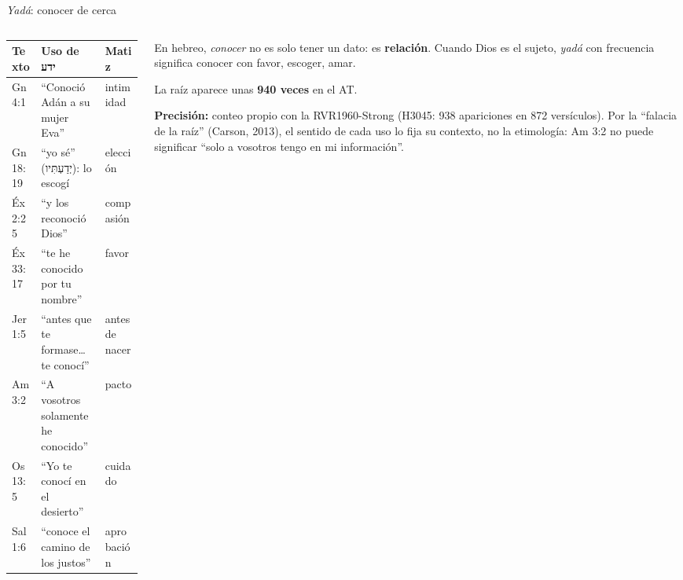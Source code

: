 \documentclass[hyperref={bookmarks=false},aspectratio=169]{beamer}
\newcommand{\heb}[1]{\mbox{\foreignlanguage{hebrew}{#1}}}
\newcommand{\destacar}[1]{\textbf{\textcolor{azul}{#1}}}
\newcommand{\precision}[1]{{\footnotesize\color{gris}\textbf{Precisión:} #1}}
\begin{document}
\begin{frame}{\emph{Yadá}: conocer de cerca}
\begin{columns}[t,onlytextwidth]
\begin{column}{0.55\textwidth}
\scriptsize\renewcommand{\arraystretch}{1.14}
\begin{tabular}{@{}>{\RaggedRight\arraybackslash}p{2.0cm}>{\RaggedRight\arraybackslash}p{2.9cm}>{\RaggedRight\arraybackslash}p{1.3cm}@{}}
\toprule
\textbf{Texto} & \textbf{Uso de \heb{ידע}} & \textbf{Matiz} \\ \midrule
Gn 4:1 & ``Conoció Adán a su mujer Eva'' & intimidad \\
Gn 18:19 & ``yo sé'' (\heb{יְדַעְתִּיו}): lo escogí & elección \\
Éx 2:25 & ``y los reconoció Dios'' & compasión \\
Éx 33:17 & ``te he conocido por tu nombre'' & favor \\
Jer 1:5 & ``antes que te formase\ldots{} te conocí'' & antes de nacer \\
Am 3:2 & ``A vosotros solamente he conocido'' & pacto \\
Os 13:5 & ``Yo te conocí en el desierto'' & cuidado \\
Sal 1:6 & ``conoce el camino de los justos'' & aprobación \\
\bottomrule
\end{tabular}
\end{column}
\begin{column}{0.43\textwidth}\small
En hebreo, \emph{conocer} no es solo tener un dato: es \destacar{relación}. Cuando Dios es el sujeto, \emph{yadá} con frecuencia significa conocer con favor, escoger, amar.\par\smallskip
\scriptsize La raíz aparece unas \destacar{940 veces} en el AT.\par\smallskip
\precision{conteo propio con la RVR1960-Strong (H3045: 938 apariciones en 872 versículos). Por la ``falacia de la raíz'' (Carson, 2013), el sentido de cada uso lo fija su contexto, no la etimología: Am 3:2 no puede significar ``solo a vosotros tengo en mi información''.}
\end{column}
\end{columns}
\end{frame}
\end{document}
